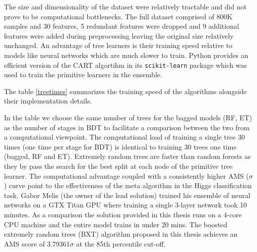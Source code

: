 The size and dimensionality of the dataset were relatively tractable and did not prove to be computational bottlenecks. The full dataset comprised of 800K samples and 30 features, 5 redundant features were dropped and 9 additional features were added during preprocessing leaving the original size relatively unchanged. An advantage of tree learners is their training speed relative to models like neural networks which are much slower to train. Python provides an efficient version of the CART algortihm in its \texttt{scikit-learn} package which was used to train the primitive learners in the ensemble.  
 
The table \ref{treetimes} summarizes the training speed of the algorithms alongside their implementation details.

\begin{table}[H]
\caption{Runtime of tree ensembles on a single CPU 4-core machine}
\label{treetimes}
\end{table}

In the table we choose the same number of trees for the bagged models (RF, ET) as the number of stages in BDT to facilitate a comparison between the two from a computational viewpoint. The computational load of training a single tree 30 times (one time per stage for BDT) is identical to training 30 trees one time (bagged, RF and ET). Extremely random trees are faster than random forests as they by pass the search for the best split at each node of the primitive tree learner. The computational advantage coupled with a consistently higher AMS ($\sigma$) curve point to the effectiveness of the meta algorithm in the Higgs classification task. Gabor Melis (the owner of the lead solution) trained his ensemble of neural networks on a GTX Titan GPU where training a single 3-layer network took 10 minutes. As a comparison the solution provided in this thesis runs on a 4-core CPU machine and the entire model trains in under 20 mins. The boosted extremely random trees (BXT) algorithm proposed in this thesis achieves an AMS score of 3.79361$\sigma$ at the 85th percentile cut-off.


